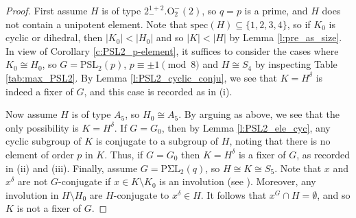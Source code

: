 \documentclass[twoside,a4paper,reqno,11pt]{amsart}
\newcommand{\<}{\langle}
\renewcommand{\>}{\rangle}
\newcommand{\leqs}{\leqslant}
\newcommand{\PSL}{\mathrm{PSL}}
\newcommand{\GL}{\mathrm{GL}}
\newcommand{\PGL}{\mathrm{PGL}}
\newcommand{\PSigmaL}{\mathrm{P\Sigma L}}
\newcommand{\Spec}{\mathrm{spec}}
\newtheorem{lem}[thm]{Lemma}
\theoremstyle{definition}
\begin{document}
	\begin{proof}
		First assume $H$ is of type $2^{1+2}_-.\mathrm{O}_2^-(2)$, so $q = p$ is a prime, and $H$ does not contain a unipotent element. Note that $\Spec(H) \subseteq \{1,2,3,4\}$, so if $K_0$ is cyclic or dihedral, then $|K_0| < |H_0|$ and so $|K| < |H|$ by Lemma \ref{l:pre_as_size}. In view of Corollary \ref{c:PSL2_p-element}, it suffices to consider the cases where $K_0\cong H_0$, so $G = \PSL_2(p)$, $p\equiv \pm 1\pmod 8$ and $H\cong S_4$ by inspecting Table \ref{tab:max_PSL2}. By Lemma \ref{l:PSL2_cyclic_conju}, we see that $K = H^\delta$ is indeed a fixer of $G$, and this case is recorded as in (i).
		
		Now assume $H$ is of type $A_5$, so $H_0\cong A_5$. By arguing as above, we see that the only possibility is $K = H^\delta$. If $G = G_0$, then by Lemma \ref{l:PSL2_ele_cyc}, any cyclic subgroup of $K$ is conjugate to a subgroup of $H$, noting that there is no element of order $p$ in $K$.
		Thus, if $G = G_0$ then $K = H^\delta$ is a fixer of $G$, as recorded in (ii) and (iii). Finally, assume $G = \PSigmaL_2(q)$, so $H\cong K\cong S_5$. Note that $x$ and $x^\delta$ are not $G$-conjugate if $x\in K\setminus K_0$ is an involution (see \cite[Proposition 3.2.9]{BG_classical}). Moreover, any involution in $H\setminus H_0$ are $H$-conjugate to $x^\delta\in H$. It follows that $x^G\cap H = \emptyset$, and so $K$ is not a fixer of $G$.
	\end{proof}
	
	
\end{document}
